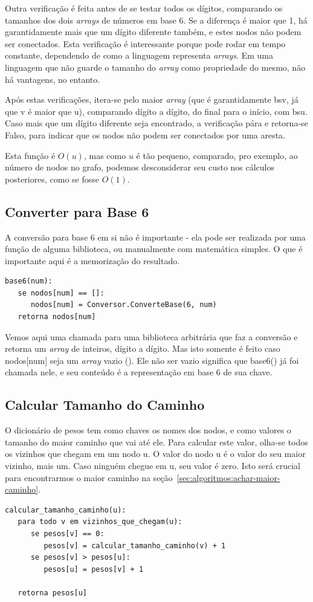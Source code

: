 \documentclass[12pt]{article}
\begin{document}
Outra verifica\c{c}ão é feita antes de se testar todos os dígitos, comparando os tamanhos dos dois \textit{arrays} de números em base 6. Se a diferen\c{c}a é maior que 1, há garantidamente mais que um dígito diferente também, e estes nodos não podem ser conectados. Esta verifica\c{c}ão é interessante porque pode rodar em tempo constante, dependendo de como a linguagem representa \textit{arrays}. Em uma linguagem que não guarde o tamanho do \textit{array} como propriedade do mesmo, não há vantagens, no entanto.

Após estas verifica\c{c}ões, itera-se pelo maior \textit{array} (que é garantidamente {\sf bsv}, já que {\sf v} é maior que {\sf u}), comparando dígito a dígito, do final para o início, com {\sf bsu}. Caso mais que um dígito diferente seja encontrado, a verifica\c{c}ão pára e retorna-se Falso, para indicar que os nodos não podem ser conectados por uma aresta.

Esta fun\c{c}ão é $O(u)$, mas como $u$ é tão pequeno, comparado, pro exemplo, ao número de nodos no grafo, podemos desconsiderar seu custo nos cálculos posteriores, como se fosse $O(1)$.

\subsection{Converter para Base 6}\label{sec:algoritmos:base6}
A conversão para base 6 em si não é importante - ela pode ser realizada por uma fun\c{c}ão de alguma biblioteca, ou manualmente com matemática simples. O que é importante aqui é a memoriza\c{c}ão do resultado.
\begin{lstlisting}
base6(num):
   se nodos[num] == []:
      nodos[num] = Conversor.ConverteBase(6, num)
   retorna nodos[num]
\end{lstlisting}

Vemos aqui uma chamada para uma biblioteca arbitrária que faz a conversão e retorna um \textit{array} de inteiros, dígito a dígito. Mas isto somente é feito caso {\sf nodos[num]} seja um \textit{array} vazio ({\sf []}). Ele não ser vazio significa que {\sf base6()} já foi chamada nele, e seu conteúdo é a representa\c{c}ão em base 6 de sua chave.

\subsection{Calcular Tamanho do Caminho}\label{sec:algoritmos:calcular-tamanho-caminhos}
O dicionário de pesos tem como chaves os nomes dos nodos, e como valores o tamanho do maior caminho que vai até ele.
Para calcular este valor, olha-se todos os vizinhos que chegam em um nodo {\sf u}. O valor do nodo {\sf u} é o valor do seu maior vizinho, mais um. Caso ninguém chegue em {\sf u}, seu valor é zero.
Isto será crucial para encontrarmos o maior caminho na se\c{c}ão~\ref{sec:algoritmos:achar-maior-caminho}.
\begin{lstlisting}
calcular_tamanho_caminho(u):
   para todo v em vizinhos_que_chegam(u):
      se pesos[v] == 0:
         pesos[v] = calcular_tamanho_caminho(v) + 1
      se pesos[v] > pesos[u]:
         pesos[u] = pesos[v] + 1

   retorna pesos[u]
\end{lstlisting}
\end{document}
